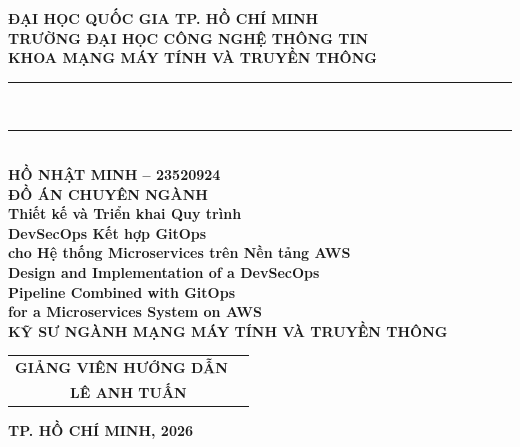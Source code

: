 \documentclass[13pt,a4paper,twoside]{extarticle}
\begin{document}
\pagestyle{empty}
\begin{center}

{\fontsize{14}{18}\bfseries ĐẠI HỌC QUỐC GIA TP. HỒ CHÍ MINH}\\[4pt]
{\fontsize{16}{20}\bfseries TRƯỜNG ĐẠI HỌC CÔNG NGHỆ THÔNG TIN}\\[4pt]
{\fontsize{16}{20}\bfseries KHOA MẠNG MÁY TÍNH VÀ TRUYỀN THÔNG}\\[40pt]

\rule{\textwidth}{1.5pt}\\[6pt]
\rule{\textwidth}{0.3pt}\\[30pt]

{\fontsize{14}{18}\bfseries HỒ NHẬT MINH -- 23520924}\\[40pt]

{\fontsize{16}{20}\bfseries ĐỒ ÁN CHUYÊN NGÀNH}\\[20pt]

{\fontsize{22}{28}\bfseries Thiết kế và Triển khai Quy trình}\\[6pt]
{\fontsize{22}{28}\bfseries DevSecOps Kết hợp GitOps}\\[6pt]
{\fontsize{22}{28}\bfseries cho Hệ thống Microservices trên Nền tảng AWS}\\[12pt]

{\fontsize{18}{22}\bfseries Design and Implementation of a DevSecOps}\\[4pt]
{\fontsize{18}{22}\bfseries Pipeline Combined with GitOps}\\[4pt]
{\fontsize{18}{22}\bfseries for a Microservices System on AWS}\\[40pt]

{\fontsize{14}{18}\bfseries KỸ SƯ NGÀNH MẠNG MÁY TÍNH VÀ TRUYỀN THÔNG}\\[30pt]

\begin{tabular}{rl}
\textbf{GIẢNG VIÊN HƯỚNG DẪN} & \\[6pt]
\multicolumn{2}{c}{\fontsize{14}{18}\bfseries LÊ ANH TUẤN}\\[40pt]
\end{tabular}

{\fontsize{13}{16}\bfseries TP. HỒ CHÍ MINH, 2026}

\end{center}
\restoregeometry

\newpage
\end{document}
